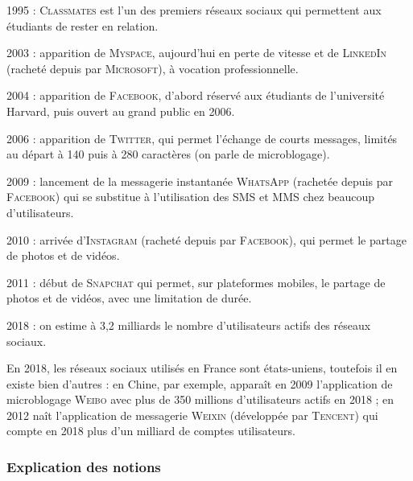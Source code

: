 
\begin{tcolorbox}[title={Repères historiques}, toprule=0pt, leftrule=0pt, rightrule=0pt, arc=0pt,
                  fonttitle=\scshape\boxtitlefont,
                  colbacktitle=white, coltitle=firstcolor, colframe=firstcolor, colback=firstcolor!10,
                  breakable, enhanced jigsaw]
\begin{jazzitemize}
\item 1995 : \textsc{Classmates} est l’un des premiers réseaux sociaux qui permettent aux étudiants de rester en relation.
\item 2003 : apparition de \textsc{Myspace}, aujourd’hui en perte de vitesse et de \textsc{LinkedIn} (racheté depuis par \textsc{Microsoft}), à vocation professionnelle.
\item 2004 : apparition de \textsc{Facebook}, d’abord réservé aux étudiants de l’université Harvard, puis ouvert au grand public en 2006.   
\item 2006 : apparition de \textsc{Twitter}, qui permet l’échange de courts messages, limités au départ à 140 puis à 280 caractères (on parle de microblogage).
\item 2009 : lancement de la messagerie instantanée \textsc{WhatsApp} (rachetée depuis par \textsc{Facebook}) qui se substitue à l’utilisation des SMS et MMS chez beaucoup d’utilisateurs.
\item 2010 : arrivée d’\textsc{Instagram} (racheté depuis par \textsc{Facebook}), qui permet le partage de photos et de vidéos. 
\item 2011 : début de \textsc{Snapchat} qui permet, sur plateformes mobiles, le partage de photos et de vidéos, avec une limitation de durée.
\item 2018 : on estime à 3,2 milliards le nombre d’utilisateurs actifs des réseaux sociaux.
\end{jazzitemize}

En 2018, les réseaux sociaux utilisés en France sont états-uniens, toutefois il en existe bien d’autres : en Chine, par exemple, apparaît en 2009 l’application de microblogage \textsc{Weibo} avec plus de 350 millions d’utilisateurs actifs en 2018 ; en 2012 naît l’application de messagerie \textsc{Weixin} (développée par \textsc{Tencent}) qui compte en 2018 plus d’un milliard de comptes utilisateurs.
\end{tcolorbox}


\subsubsection[Explication des notions]{Explication des notions}
\label{subsub:IX.3.1.3}

